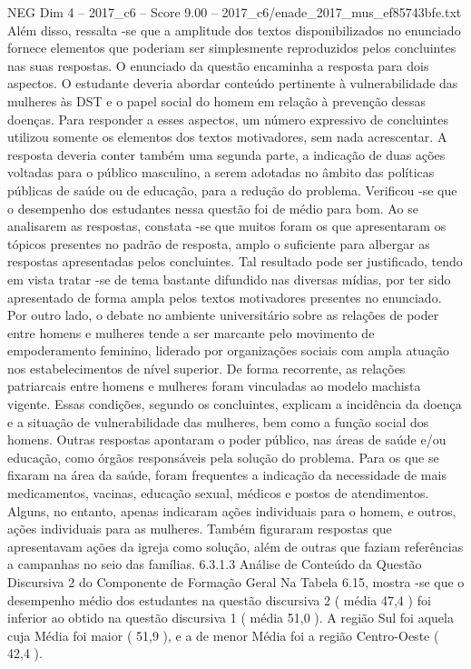 \begin{textsample}{NEG Dim 4 – 2017\_c6 – Score 9.00 – 2017\_c6/enade\_2017\_mus\_ef85743bfe.txt}
Além disso, ressalta -se que a amplitude dos textos disponibilizados no enunciado fornece elementos que poderiam ser simplesmente reproduzidos pelos concluintes nas suas respostas.
O enunciado da questão encaminha a resposta para dois aspectos.
O estudante deveria abordar conteúdo pertinente à vulnerabilidade das mulheres às DST e o papel social do homem em relação à prevenção dessas doenças.
Para responder a esses aspectos, um número expressivo de concluintes utilizou somente os elementos dos textos motivadores, sem nada acrescentar.
A resposta deveria conter também uma segunda parte, a indicação de duas ações voltadas para o público masculino, a serem adotadas no âmbito das políticas públicas de saúde ou de educação, para a redução do problema.
Verificou -se que o desempenho dos estudantes nessa questão foi de médio para bom.
Ao se analisarem as respostas, constata -se que muitos foram os que apresentaram os tópicos presentes no padrão de resposta, amplo o suficiente para albergar as respostas apresentadas pelos concluintes.
Tal resultado pode ser justificado, tendo em vista tratar -se de tema bastante difundido nas diversas mídias, por ter sido apresentado de forma ampla pelos textos motivadores presentes no enunciado.
Por outro lado, o debate no ambiente universitário sobre as relações de poder entre homens e mulheres tende a ser marcante pelo movimento de empoderamento feminino, liderado por organizações sociais com ampla atuação nos estabelecimentos de nível superior.
De forma recorrente, as relações patriarcais entre homens e mulheres foram vinculadas ao modelo machista vigente.
Essas condições, segundo os concluintes, explicam a incidência da doença e a situação de vulnerabilidade das mulheres, bem como a função social dos homens.
Outras respostas apontaram o poder público, nas áreas de saúde e/ou educação, como órgãos responsáveis pela solução do problema.
Para os que se fixaram na área da saúde, foram frequentes a indicação da necessidade de mais medicamentos, vacinas, educação sexual, médicos e postos de atendimentos.
Alguns, no entanto, apenas indicaram ações individuais para o homem, e outros, ações individuais para as mulheres.
Também figuraram respostas que apresentavam ações da igreja como solução, além de outras que faziam referências a campanhas no seio das famílias. 6.3.1.3 Análise de Conteúdo da Questão Discursiva 2 do Componente de Formação Geral Na Tabela 6.15, mostra -se que o desempenho médio dos estudantes na questão discursiva 2 ( média 47,4 ) foi inferior ao obtido na questão discursiva 1 ( média 51,0 ).
A região Sul foi aquela cuja Média foi maior ( 51,9 ), e a de menor Média foi a região Centro-Oeste ( 42,4 ).

\end{textsample}

